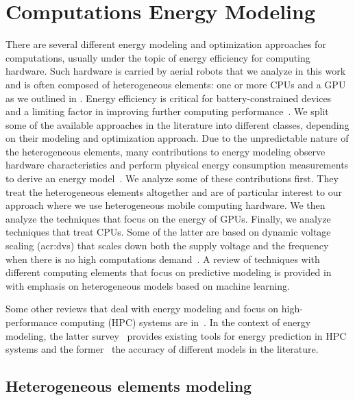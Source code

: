 \section{Computations Energy Modeling}
\label{sec:soa-ene-mod}

There are several different energy modeling and optimization approaches for computations, usually under the topic of energy efficiency for computing hardware.
Such hardware is carried by aerial robots that we analyze in this work and is often composed of heterogeneous elements: one or more CPUs and a GPU as we outlined in . Energy efficiency is critical for battery-constrained devices~\citep{seewald202Xenergy} and a limiting factor in improving further computing performance~\citep{horowitz2014computing}. We split some of the available approaches in the literature into different classes, depending on their modeling and optimization approach. Due to the unpredictable nature of the heterogeneous elements, many contributions to energy modeling observe hardware characteristics and perform physical energy consumption measurements to derive an energy model~\citep{teamplay}. We analyze some of these contributions first. They treat the heterogeneous elements altogether and are of particular interest to our approach where we use heterogeneous mobile computing hardware. We then analyze the techniques that focus on the energy of GPUs. Finally, we analyze techniques that treat CPUs. Some of the latter are based on dynamic voltage scaling (\Gls{acr:dvs}) that scales down both the supply voltage and the frequency when there is no high computations demand~\citep{flautner2001automatic, chen2009fundamentals}. A review of techniques with different computing elements that focus on predictive modeling is provided in~\citep{oneal2018predictive} with emphasis on heterogeneous models based on machine learning.

Some other reviews that deal with energy modeling and focus on high-performance computing (HPC) systems are in~\citep{obrien2017survey,czarnul2019energy}. In the context of energy modeling, the latter survey~\citep{czarnul2019energy} provides existing tools for energy prediction in HPC systems and the former~\citep{obrien2017survey} the accuracy of different models in the literature.

\subsection{Heterogeneous elements modeling}
\label{sec:soa-ene-hete}

